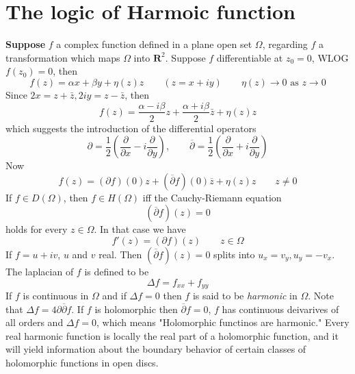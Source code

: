 \section{The logic of Harmoic function}
\textbf{Suppose} $f$ a complex function defined in a plane open set $\Omega$, regarding $f$ a transformation which maps $\Omega$ into $\mathbf{R}^{2}$. Suppose $f$ differentiable at $z_0=0$, WLOG $f(z_0)=0$, then
\[
f(z)=\alpha x+\beta y+\eta(z)z\qquad (z=x+iy) \qquad \eta(z)\to0\text{ as }z\to0
\]
Since $2x=z+\bar{z},2iy=z-\bar{z}$, then
\[
f(z)=\frac{\alpha-i\beta}{2}z+\frac{\alpha+i\beta}{2}\bar{z}+\eta(z)z
\]
which suggests the introduction of the differential operators
\[
\partial =\frac{1}{2}\left( \frac{ \partial   }{ \partial x } -i\frac{ \partial   }{ \partial y }  \right),\qquad \overline{\partial }=\frac{1}{2}\left( \frac{ \partial   }{ \partial x } +i\frac{ \partial   }{ \partial y }  \right)
\]
Now
\[
f(z)=(\partial f)(0)z+(\overline{\partial }f)(0)\overline{z}+\eta(z)z\qquad z\neq 0
\]
If $f\in D(\Omega)$, then $f\in H(\Omega)$ iff the Cauchy-Riemann equation
\[
(\overline{\partial }f)(z)=0
\]
holds for every $z\in \Omega$. In that case we have
\[
f'(z)=(\partial f)(z)\qquad z\in \Omega
\]
If $f=u+iv$, $u$ and $v$ real. Then $(\overline{\partial }f)(z)=0$ splits into $u_{x}=v_{y},u_{y}=-v_{x}$.
The laplacian of $f$ is defined to be
\[
\Delta f=f_{xx}+f_{yy}
\]
If $f$ is continuous in $\Omega$ and if $\Delta f=0$ then $f$ is said to be \textit{harmonic} in $\Omega$.
Note that $\Delta f=4\partial  \overline{\partial}f$. If $f$ is holomorphic then $\overline{\partial}f=0$, $f$ has continuous deivarives of all orders and $\Delta f=0$, which means "Holomorphic functinos are harmonic."
Every real harmonic function is locally the real part of a holomorphic function, and it will yield information about the boundary behavior of certain classes of holomorphic functions in open discs.

